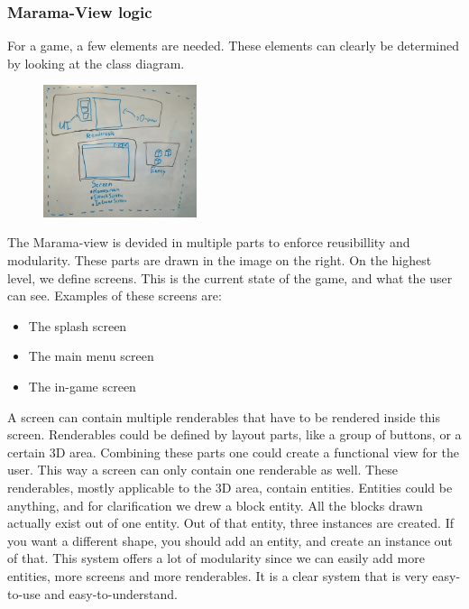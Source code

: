 \documentclass[10pt]{extarticle} %
\begin{document}
    \subsubsection[MaramaViewLogic]{Marama-View logic}
    For a game, a few elements are needed. These elements can clearly be determined by looking at the class diagram. \\
    \begin{figure}
        \includegraphics[width=0.4\textwidth]{marama-view-structure.jpg}
    \end{figure}
    The Marama-view is devided in multiple parts to enforce reusibillity and modularity.
    These parts are drawn in the image on the right.
    On the highest level, we define screens.
    This is the current state of the game, and what the user can see.
    Examples of these screens are:
    \begin{itemize}
        \item The splash screen
        \item The main menu screen
        \item The in-game screen
    \end{itemize}
    A screen can contain multiple renderables that have to be rendered inside this screen.
    Renderables could be defined by layout parts, like a group of buttons, or a certain 3D area.
    Combining these parts one could create a functional view for the user.
    This way a screen can only contain one renderable as well.
    These renderables, mostly applicable to the 3D area, contain entities.
    Entities could be anything, and for clarification we drew a block entity.
    All the blocks drawn actually exist out of one entity.
    Out of that entity, three instances are created.
    If you want a different shape, you should add an entity, and create an instance out of that.
    This system offers a lot of modularity since we can easily add more entities, more screens and more renderables.
    It is a clear system that is very easy-to-use and easy-to-understand.
\end{document}
